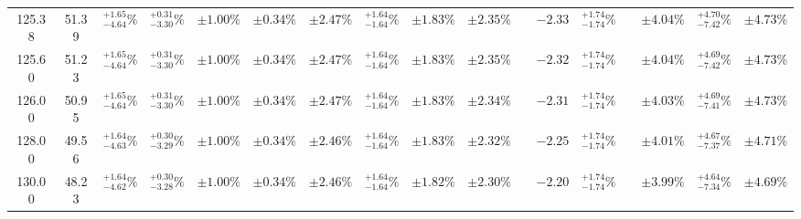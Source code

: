 \begin{landscape}
\begin{table}[ht!]
{\begin{tabular}{| cc | cccc | ccc | c |@{}c@{\;}| cc |@{}c@{\;}| ccc |}
125.38 & 51.39 & \({}^{ +1.65}_{ -4.64}\%\) & {\color{black!55}\({}^{ +0.31}_{ -3.30}\%\)} & {\color{black!55}\(\pm{  1.00}\%\)} & {\color{black!55}\(\pm{  0.34}\%\)} & \(\pm 2.47\%\) & {\color{black!55}\({}^{ +1.64}_{ -1.64}\%\)} & {\color{black!55}\(\pm 1.83\%\)} & \(\pm{  2.35}\%\) &  & \(-2.33\) & \({}^{ +1.74}_{ -1.74}\%\) &  & \(\pm 4.04\%\) & \({}^{ +4.70}_{ -7.42}\%\) & \(\pm 4.73\%\)\\
125.60 & 51.23 & \({}^{ +1.65}_{ -4.64}\%\) & {\color{black!55}\({}^{ +0.31}_{ -3.30}\%\)} & {\color{black!55}\(\pm{  1.00}\%\)} & {\color{black!55}\(\pm{  0.34}\%\)} & \(\pm 2.47\%\) & {\color{black!55}\({}^{ +1.64}_{ -1.64}\%\)} & {\color{black!55}\(\pm 1.83\%\)} & \(\pm{  2.35}\%\) &  & \(-2.32\) & \({}^{ +1.74}_{ -1.74}\%\) &  & \(\pm 4.04\%\) & \({}^{ +4.69}_{ -7.42}\%\) & \(\pm 4.73\%\)\\
126.00 & 50.95 & \({}^{ +1.65}_{ -4.64}\%\) & {\color{black!55}\({}^{ +0.31}_{ -3.30}\%\)} & {\color{black!55}\(\pm{  1.00}\%\)} & {\color{black!55}\(\pm{  0.34}\%\)} & \(\pm 2.47\%\) & {\color{black!55}\({}^{ +1.64}_{ -1.64}\%\)} & {\color{black!55}\(\pm 1.83\%\)} & \(\pm{  2.34}\%\) &  & \(-2.31\) & \({}^{ +1.74}_{ -1.74}\%\) &  & \(\pm 4.03\%\) & \({}^{ +4.69}_{ -7.41}\%\) & \(\pm 4.73\%\)\\
128.00 & 49.56 & \({}^{ +1.64}_{ -4.63}\%\) & {\color{black!55}\({}^{ +0.30}_{ -3.29}\%\)} & {\color{black!55}\(\pm{  1.00}\%\)} & {\color{black!55}\(\pm{  0.34}\%\)} & \(\pm 2.46\%\) & {\color{black!55}\({}^{ +1.64}_{ -1.64}\%\)} & {\color{black!55}\(\pm 1.83\%\)} & \(\pm{  2.32}\%\) &  & \(-2.25\) & \({}^{ +1.74}_{ -1.74}\%\) &  & \(\pm 4.01\%\) & \({}^{ +4.67}_{ -7.37}\%\) & \(\pm 4.71\%\)\\
130.00 & 48.23 & \({}^{ +1.64}_{ -4.62}\%\) & {\color{black!55}\({}^{ +0.30}_{ -3.28}\%\)} & {\color{black!55}\(\pm{  1.00}\%\)} & {\color{black!55}\(\pm{  0.34}\%\)} & \(\pm 2.46\%\) & {\color{black!55}\({}^{ +1.64}_{ -1.64}\%\)} & {\color{black!55}\(\pm 1.82\%\)} & \(\pm{  2.30}\%\) &  & \(-2.20\) & \({}^{ +1.74}_{ -1.74}\%\) &  & \(\pm 3.99\%\) & \({}^{ +4.64}_{ -7.34}\%\) & \(\pm 4.69\%\)\\
\cline{1-10} \cline{12-13} \cline{15-17}
\end{tabular}
}
\end{table}


\end{landscape}
